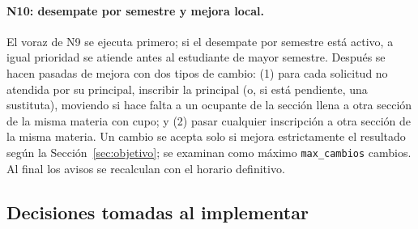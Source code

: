 \paragraph{N10: desempate por semestre y mejora local.} El voraz de N9 se ejecuta primero; si el desempate por semestre está activo, a igual prioridad se atiende antes al estudiante de mayor semestre. Después se hacen pasadas de mejora con dos tipos de cambio: (1) para cada solicitud no atendida por su principal, inscribir la principal (o, si está pendiente, una sustituta), moviendo si hace falta a un ocupante de la sección llena a otra sección de la misma materia con cupo; y (2) pasar cualquier inscripción a otra sección de la misma materia. Un cambio se acepta solo si mejora estrictamente el resultado según la Sección~\ref{sec:objetivo}; se examinan como máximo \texttt{max\_cambios} cambios. Al final los avisos se recalculan con el horario definitivo.

\subsection{Decisiones tomadas al implementar}\label{sec:decisiones}

